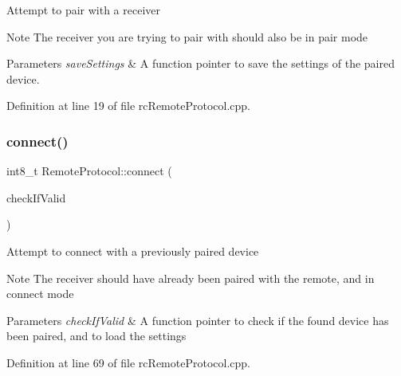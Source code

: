 Attempt to pair with a receiver

\begin{DoxyNote}{Note}
The receiver you are trying to pair with should also be in pair mode
\end{DoxyNote}

\begin{DoxyParams}{Parameters}
{\em save\+Settings} & A function pointer to save the settings of the paired device. \\
\hline
\end{DoxyParams}


Definition at line 19 of file rc\+Remote\+Protocol.\+cpp.

\mbox{\label{classRemoteProtocol_a0948e420ac812906e683fb47041287b8}} 
\subsubsection{\texorpdfstring{connect()}{connect()}}
{\footnotesize\ttfamily int8\+\_\+t Remote\+Protocol\+::connect (\begin{DoxyParamCaption}\item[{\hyperlink{classRemoteProtocol_a6c79a9aff87a0ef816d49e1eda9a639e}{Remote\+Protocol\+::check\+If\+Valid}}]{check\+If\+Valid }\end{DoxyParamCaption})}

Attempt to connect with a previously paired device

\begin{DoxyNote}{Note}
The receiver should have already been paired with the remote, and in connect mode
\end{DoxyNote}

\begin{DoxyParams}{Parameters}
{\em check\+If\+Valid} & A function pointer to check if the found device has been paired, and to load the settings \\
\hline
\end{DoxyParams}


Definition at line 69 of file rc\+Remote\+Protocol.\+cpp.

\mbox{\label{classRemoteProtocol_ad837e6469d792f906551293ce0a9ad71}} 
